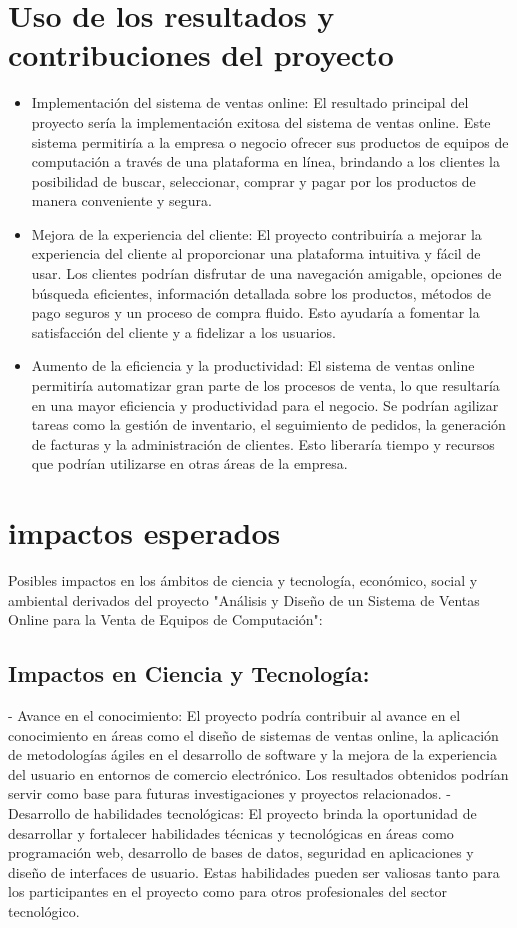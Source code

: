 \documentclass[12pt,a4paper]{article}
\newcommand{\newsection}[1]{\section{\hspace{4mm} #1}}%
\begin{document}
\newpage
\newsection{Uso de los resultados y contribuciones del proyecto}

\begin{itemize}
    \item Implementación del sistema de ventas online: El resultado principal del proyecto sería la implementación exitosa del sistema de ventas online. Este sistema permitiría a la empresa o negocio ofrecer sus productos de equipos de computación a través de una plataforma en línea, brindando a los clientes la posibilidad de buscar, seleccionar, comprar y pagar por los productos de manera conveniente y segura.
    \item Mejora de la experiencia del cliente: El proyecto contribuiría a mejorar la experiencia del cliente al proporcionar una plataforma intuitiva y fácil de usar. Los clientes podrían disfrutar de una navegación amigable, opciones de búsqueda eficientes, información detallada sobre los productos, métodos de pago seguros y un proceso de compra fluido. Esto ayudaría a fomentar la satisfacción del cliente y a fidelizar a los usuarios.
    \item Aumento de la eficiencia y la productividad: El sistema de ventas online permitiría automatizar gran parte de los procesos de venta, lo que resultaría en una mayor eficiencia y productividad para el negocio. Se podrían agilizar tareas como la gestión de inventario, el seguimiento de pedidos, la generación de facturas y la administración de clientes. Esto liberaría tiempo y recursos que podrían utilizarse en otras áreas de la empresa.
    
\end{itemize}



\newpage
\newsection{impactos esperados}

Posibles impactos en los ámbitos de ciencia y tecnología, económico, social y ambiental derivados del proyecto "Análisis y Diseño de un Sistema de Ventas Online para la Venta de Equipos de Computación":

\subsection*{Impactos en Ciencia y Tecnología:}
   - Avance en el conocimiento: El proyecto podría contribuir al avance en el conocimiento en áreas como el diseño de sistemas de ventas online, la aplicación de metodologías ágiles en el desarrollo de software y la mejora de la experiencia del usuario en entornos de comercio electrónico. Los resultados obtenidos podrían servir como base para futuras investigaciones y proyectos relacionados.
   - Desarrollo de habilidades tecnológicas: El proyecto brinda la oportunidad de desarrollar y fortalecer habilidades técnicas y tecnológicas en áreas como programación web, desarrollo de bases de datos, seguridad en aplicaciones y diseño de interfaces de usuario. Estas habilidades pueden ser valiosas tanto para los participantes en el proyecto como para otros profesionales del sector tecnológico.
\end{document}
